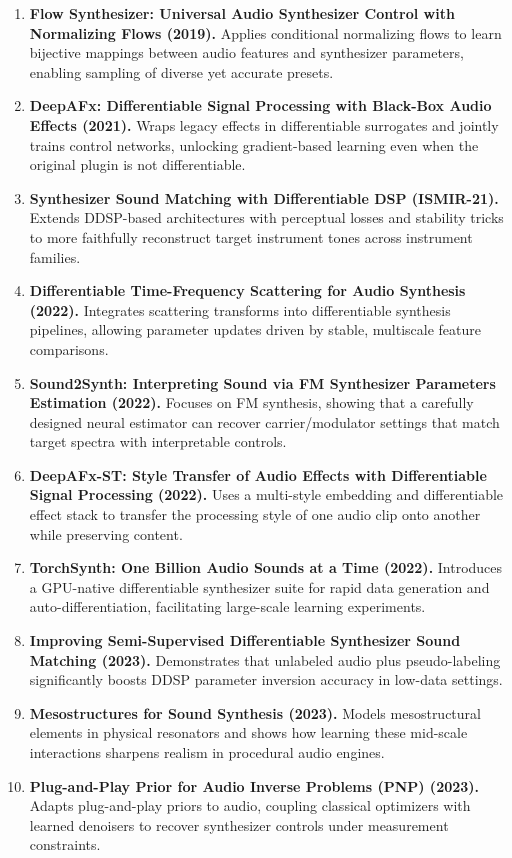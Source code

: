 \documentclass[12pt]{article}
\begin{document}
\begin{enumerate}[leftmargin=*]
    \item \textbf{Flow Synthesizer: Universal Audio Synthesizer Control with Normalizing Flows (2019).} Applies conditional normalizing flows to learn bijective mappings between audio features and synthesizer parameters, enabling sampling of diverse yet accurate presets.
    \item \textbf{DeepAFx: Differentiable Signal Processing with Black-Box Audio Effects (2021).} Wraps legacy effects in differentiable surrogates and jointly trains control networks, unlocking gradient-based learning even when the original plugin is not differentiable.
    \item \textbf{Synthesizer Sound Matching with Differentiable DSP (ISMIR-21).} Extends DDSP-based architectures with perceptual losses and stability tricks to more faithfully reconstruct target instrument tones across instrument families.
    \item \textbf{Differentiable Time-Frequency Scattering for Audio Synthesis (2022).} Integrates scattering transforms into differentiable synthesis pipelines, allowing parameter updates driven by stable, multiscale feature comparisons.
    \item \textbf{Sound2Synth: Interpreting Sound via FM Synthesizer Parameters Estimation (2022).} Focuses on FM synthesis, showing that a carefully designed neural estimator can recover carrier/modulator settings that match target spectra with interpretable controls.
    \item \textbf{DeepAFx-ST: Style Transfer of Audio Effects with Differentiable Signal Processing (2022).} Uses a multi-style embedding and differentiable effect stack to transfer the processing style of one audio clip onto another while preserving content.
    \item \textbf{TorchSynth: One Billion Audio Sounds at a Time (2022).} Introduces a GPU-native differentiable synthesizer suite for rapid data generation and auto-differentiation, facilitating large-scale learning experiments.
    \item \textbf{Improving Semi-Supervised Differentiable Synthesizer Sound Matching (2023).} Demonstrates that unlabeled audio plus pseudo-labeling significantly boosts DDSP parameter inversion accuracy in low-data settings.
    \item \textbf{Mesostructures for Sound Synthesis (2023).} Models mesostructural elements in physical resonators and shows how learning these mid-scale interactions sharpens realism in procedural audio engines.
    \item \textbf{Plug-and-Play Prior for Audio Inverse Problems (PNP) (2023).} Adapts plug-and-play priors to audio, coupling classical optimizers with learned denoisers to recover synthesizer controls under measurement constraints.

\end{enumerate}
\end{document}
